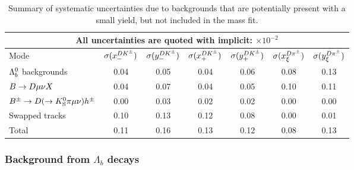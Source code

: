 \begin{table}
    \centering
    \footnotesize
    \caption{Summary of systematic uncertainties due to backgrounds that are potentially present with a small yield, but not included in the mass fit.
    \label{tab:small_backgrounds}}
\begin{tabular}{l|cccccc}
\toprule
\multicolumn{7}{c}{All uncertainties are quoted with implicit: $\times 10^{-2}$} \\
\midrule
Mode & 
$\sigma(x_-^{{{D}{{K}^\pm}}})$ & $\sigma(y_-^{{{D}{{K}^\pm}}})$ & 
$\sigma(x_+^{{{D}{{K}^\pm}}})$ & $\sigma(y_+^{{{D}{{K}^\pm}}})$ &
$\sigma(x_\xi^{D\pi^\pm})$ & $\sigma(y_\xi^{D\pi^\pm})$ \\
\midrule
${{\Lambda}^0_{b}}$ backgrounds                        & 0.04  & 0.05  & 0.04  & 0.06  & 0.08  & 0.13  \\ 
${B}\rightarrow{\ensuremath{D}}\mu\nu X$                        & 0.04  & 0.07  & 0.04  & 0.05  & 0.10  & 0.11  \\ 
${{B}^\pm}\rightarrow{\ensuremath{D}}(\rightarrow {\ensuremath{{K}^0_{\mathrm{S}}}} \pi \mu \nu) h^\pm$   & 0.00  & 0.03  & 0.02  & 0.02  & 0.00  & 0.00  \\ 
Swapped tracks                           & 0.10  & 0.13  & 0.12  & 0.08  & 0.00  & 0.01  \\ 
\midrule
Total                                    & 0.11  & 0.16  & 0.13  & 0.12  & 0.08  & 0.13  \\ 

\bottomrule
\end{tabular}

\end{table}


\subsubsection{\texorpdfstring{Background from $\Lambda_b$ decays}{Background from Lb decays} } 
\label{sub:background_from_lambda_b_decays}

